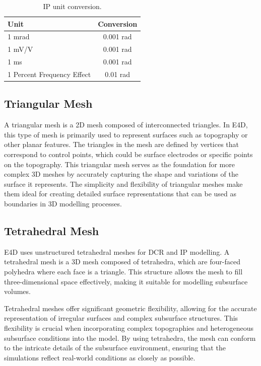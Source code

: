 \documentclass[a4paper,12pt]{article}
\begin{document}
\begin{table}[H]
    \centering
    \begin{tabular}{@{}lc@{}}
        \toprule
        Unit                       & Conversion \\ \midrule
        1 mrad                     & 0.001 rad  \\
        1 mV/V                     & 0.001 rad  \\
        1 ms                       & 0.001 rad  \\
        1 Percent Frequency Effect & 0.01 rad   \\ \bottomrule
    \end{tabular}
    \caption{IP unit conversion.}
\end{table}

\subsection{Triangular Mesh}

A triangular mesh is a 2D mesh composed of interconnected triangles. In E4D,
this type of mesh is primarily used to represent surfaces such as topography or
other planar features. The triangles in the mesh are defined by vertices that
correspond to control points, which could be surface electrodes or specific
points on the topography. This triangular mesh serves as the foundation for
more complex 3D meshes by accurately capturing the shape and variations of the
surface it represents. The simplicity and flexibility of triangular meshes make
them ideal for creating detailed surface representations that can be used as
boundaries in 3D modelling processes.

\subsection{Tetrahedral Mesh}

E4D uses unstructured tetrahedral meshes for DCR and IP modelling. A
tetrahedral mesh is a 3D mesh composed of tetrahedra, which are four-faced
polyhedra where each face is a triangle. This structure allows the mesh to fill
three-dimensional space effectively, making it suitable for modelling
subsurface volumes.

Tetrahedral meshes offer significant geometric flexibility, allowing for the
accurate representation of irregular surfaces and complex subsurface
structures. This flexibility is crucial when incorporating complex topographies
and heterogeneous subsurface conditions into the model. By using tetrahedra,
the mesh can conform to the intricate details of the subsurface environment,
ensuring that the simulations reflect real-world conditions as closely as
possible.
\end{document}
